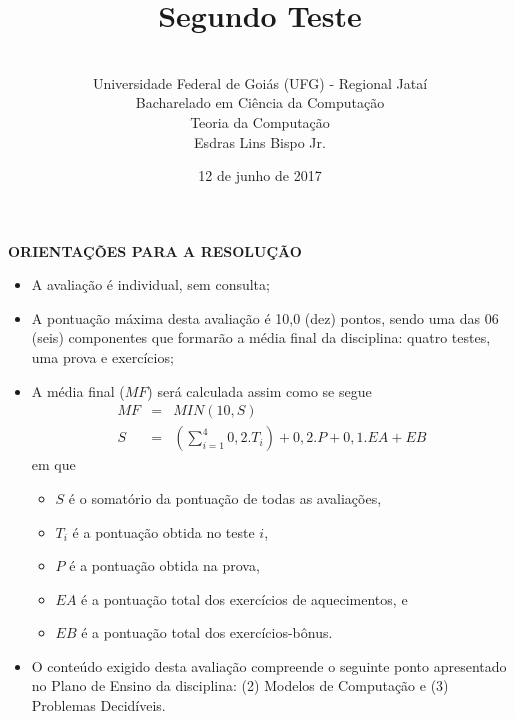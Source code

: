 \documentclass[12pt,a4paper,oneside]{article}
\author{\\Universidade Federal de Goiás (UFG) - Regional  Jataí\\Bacharelado em Ciência da Computação \\Teoria da Computação \\Esdras Lins Bispo Jr.}
\date{12 de junho de 2017}
\title{\sc \huge Segundo Teste}
\begin{document}
\maketitle

{\bf ORIENTAÇÕES PARA A RESOLUÇÃO}

\small
 
\begin{itemize}
	\item A avaliação é individual, sem consulta;
	\item A pontuação máxima desta avaliação é 10,0 (dez) pontos, sendo uma das 06 (seis) componentes que formarão a média final da disciplina: quatro testes, uma prova e exercícios;
	\item A média final ($MF$) será calculada assim como se segue
	\begin{eqnarray}
		MF & = & MIN(10, S) \nonumber \\
		S & = & (\sum_{i=1}^{4} 0,2.T_i ) + 0,2.P  + 0,1.EA + EB\nonumber
	\end{eqnarray}
	em que 
	\begin{itemize}
		\item $S$ é o somatório da pontuação de todas as avaliações,
		\item $T_i$ é a pontuação obtida no teste $i$,
		\item $P$ é a pontuação obtida na prova,
		\item $EA$ é a pontuação total dos exercícios de aquecimentos, e
		\item $EB$ é a pontuação total dos exercícios-bônus.
	\end{itemize}
	\item O conteúdo exigido desta avaliação compreende o seguinte ponto apresentado no Plano de Ensino da disciplina:  (2) Modelos de Computação e (3) Problemas Decidíveis.
\end{itemize}

\begin{center}
\end{center}\newpage
\end{document}
